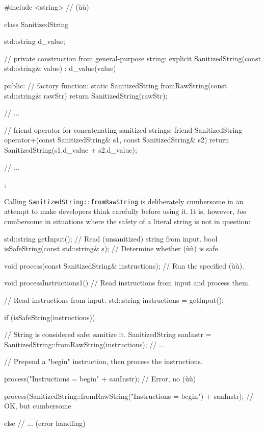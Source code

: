 \begin{emcppslisting}[emcppsbatch=e15]
#include <string>  // (ù{}ù)

class SanitizedString
{
    std::string d_value;

    // private construction from general-purpose string:
    explicit SanitizedString(const std::string& value) : d_value(value) { }

public:
    // factory function:
    static SanitizedString fromRawString(const std::string& rawStr)
    {
        return SanitizedString(rawStr);
    }

    // ...

    // friend operator for concatenating sanitized strings:
    friend SanitizedString operator+(const SanitizedString& s1,
                                     const SanitizedString& s2)
    {
        return SanitizedString(s1.d_value + s2.d_value);
    }

    // ...
};
\end{emcppslisting}
    
\noindent Calling \lstinline!SanitizedString::fromRawString! is deliberately
cumbersome in an attempt to make developers think carefully before using
it. It is, however, \emph{too} cumbersome in situations where the safety
of a literal string is not in question:

\begin{emcppslisting}[emcppsbatch=e15]
std::string getInput();  // Read (unsanitized) string from input.
bool isSafeString(const std::string& s);  // Determine whether (ù{}ù) is safe.

void process(const SanitizedString& instructions);
    // Run the specified (ù{}ù).

void processInstructions1()
    // Read instructions from input and process them.
{
    // Read instructions from input.
    std::string instructions = getInput();

    if (isSafeString(instructions))
    {
       // String is considered safe; sanitize it.
       SanitizedString sanInstr = SanitizedString::fromRawString(instructions);
       // ...

       // Prepend a "begin" instruction, then process the instructions.

       process("Instructions = begin\n" + sanInstr);
           // Error, no (ù{}ù)

       process(SanitizedString::fromRawString("Instructions = begin\n") +
               sanInstr);
           // OK, but cumbersome
    }
    else
    {
        // ...                  (error handling)
    }
}
\end{emcppslisting}
    
